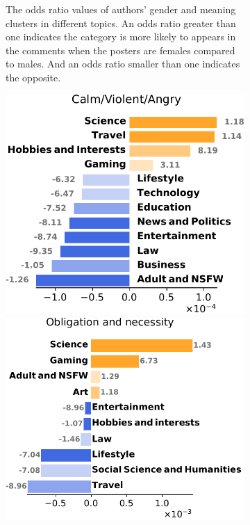 \documentclass[letterpaper]{article} %
\begin{document}
\begin{figure}[!htb]
\begin{subfigure}[b]{\textwidth}
    \caption{The odds ratio values of authors' gender and meaning clusters in different topics. An odds ratio greater than one indicates the category is more likely to appears in the comments when the posters are females compared to males. And an odds ratio smaller than one indicates the opposite.}
    \label{fig:sub1}
    \end{subfigure}
\hfill%
\begin{subfigure}[b]{\textwidth}
    \centering
    \includegraphics[scale=0.38]{figs/CalmViolentAngry.pdf}
    \includegraphics[scale=0.38]{figs/Obligationandnecessity.pdf}

\end{subfigure}
\end{figure}
\end{document}

